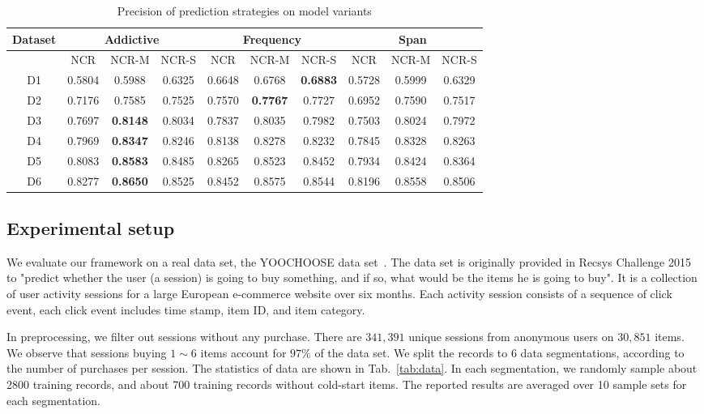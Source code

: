 \documentclass[sigconf]{acmart}
\begin{document}
\begin{table*}[htbp]
\caption{Precision of prediction strategies on model variants }
\label{tab:strategy}
\begin{tabular}{|c|c|c|c|c|c|c|c|c|c|}
\hline
Dataset & \multicolumn{3}{|c|}{Addictive} &  \multicolumn{3}{|c|}{Frequency} & \multicolumn{3}{|c|}{Span} \\\hline
  & NCR & NCR-M & NCR-S  & NCR & NCR-M & NCR-S  & NCR & NCR-M & NCR-S \\\hline
D1 & 0.5804	& 0.5988	& 0.6325& 	0.6648& 	0.6768& 	\bf{0.6883}& 	0.5728	& 0.5999	& 0.6329 \\\hline
D2& 0.7176	& 0.7585	& 0.7525	& 0.7570	& \bf{0.7767}	& 0.7727	& 0.6952	& 0.7590& 	0.7517	\\\hline
D3& 0.7697	& \bf{0.8148}	& 0.8034	& 0.7837& 	0.8035	& 0.7982	& 0.7503	& 0.8024& 	0.7972	\\\hline
D4& 0.7969& 	\bf{0.8347}	& 0.8246	& 0.8138	& 0.8278	& 0.8232& 	0.7845	& 0.8328	& 0.8263\\\hline
D5& 0.8083	& \bf{0.8583}& 	0.8485& 	0.8265& 	0.8523& 	0.8452	& 0.7934 &	0.8424& 	0.8364\\\hline
D6& 0.8277	& \bf{0.8650}	& 0.8525	& 0.8452& 	0.8575& 	0.8544& 	0.8196	& 0.8558	& 0.8506	\\ \hline 
\end{tabular}
\end{table*}

\subsection{Experimental setup}

We evaluate our framework on a real data set, the YOOCHOOSE data set~\cite{Ben-Shimon2015RecSys}. The data set is originally provided in Recsys Challenge 2015 to "predict whether the user (a session) is going to buy something, and if so, what would be the items he is going to buy". It is a collection of user activity sessions for a large
European e-commerce website over six months. Each activity session consists of a sequence of click event, each click event includes time stamp, item ID, and item category. 

In preprocessing, we filter out sessions without any purchase. There are $341,391$ unique sessions from anonymous users on $30,851$ items.  We observe that sessions buying $1\sim 6$ items account for $97\%$ of the data set. We split the records to 6 data segmentations, according to the number of purchases per session. The statistics of data are shown in Tab.~\ref{tab:data}. In each segmentation, we randomly sample about 2800 training records, and about 700 training records without cold-start items. The reported results are averaged over 10  sample sets for each segmentation.
    
\end{document}
